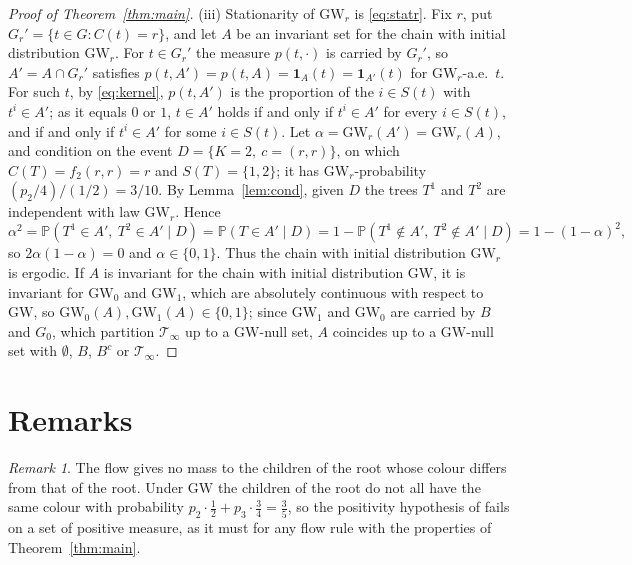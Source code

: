 \documentclass[11pt]{amsart}
\theoremstyle{remark}
\newtheorem{remark}{Remark}
\numberwithin{equation}{section}
\newcommand{\Pp}{\mathbb P}
\newcommand{\T}{\mathcal T}
\newcommand{\GW}{\mathrm{GW}}
\newcommand{\one}{\mathbf 1}
\begin{document}
\begin{proof}[Proof of Theorem~\ref{thm:main}]
(iii) Stationarity of $\GW_r$ is \eqref{eq:statr}. Fix $r$, put $G_r'=\{t\in G:C(t)=r\}$, and let $A$ be an invariant set for the chain with initial distribution $\GW_r$. For $t\in G_r'$ the measure $p(t,\cdot)$ is carried by $G_r'$, so $A'=A\cap G_r'$ satisfies $p(t,A')=p(t,A)=\one_A(t)=\one_{A'}(t)$ for $\GW_r$-a.e.\ $t$. For such $t$, by \eqref{eq:kernel}, $p(t,A')$ is the proportion of the $i\in S(t)$ with $t^i\in A'$; as it equals $0$ or $1$, $t\in A'$ holds if and only if $t^i\in A'$ for every $i\in S(t)$, and if and only if $t^i\in A'$ for some $i\in S(t)$. Let $\alpha=\GW_r(A')=\GW_r(A)$, and condition on the event $D=\{K=2,\ c=(r,r)\}$, on which $C(T)=f_2(r,r)=r$ and $S(T)=\{1,2\}$; it has $\GW_r$-probability $(p_2/4)/(1/2)=3/10$. By Lemma~\ref{lem:cond}, given $D$ the trees $T^1$ and $T^2$ are independent with law $\GW_r$. Hence
\[
\alpha^2=\Pp(T^1\in A',\ T^2\in A'\mid D)=\Pp(T\in A'\mid D)=1-\Pp(T^1\notin A',\ T^2\notin A'\mid D)=1-(1-\alpha)^2 ,
\]
so $2\alpha(1-\alpha)=0$ and $\alpha\in\{0,1\}$. Thus the chain with initial distribution $\GW_r$ is ergodic. If $A$ is invariant for the chain with initial distribution $\GW$, it is invariant for $\GW_0$ and $\GW_1$, which are absolutely continuous with respect to $\GW$, so $\GW_0(A),\GW_1(A)\in\{0,1\}$; since $\GW_1$ and $\GW_0$ are carried by $B$ and $G_0$, which partition $\T_\infty$ up to a $\GW$-null set, $A$ coincides up to a $\GW$-null set with $\emptyset$, $B$, $B^c$ or $\T_\infty$.
\end{proof}

\section{Remarks}\label{sec:remarks}

\begin{remark}\label{rem:positive}
The flow gives no mass to the children of the root whose colour differs from that of the root. Under $\GW$ the children of the root do not all have the same colour with probability $p_2\cdot\frac12+p_3\cdot\frac34=\frac35$, so the positivity hypothesis of \cite[Proposition~17.17]{LP} fails on a set of positive measure, as it must for any flow rule with the properties of Theorem~\ref{thm:main}.
\end{remark}
\end{document}
